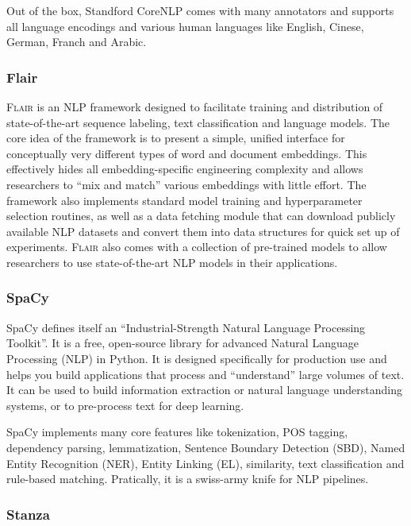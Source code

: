 Out of the box, Standford CoreNLP comes with many annotators and
supports all language encodings and various human languages like
English, Cinese, German, Franch and Arabic.

\subsubsection{Flair}

\textsc{Flair} \cite{akbik2019flair} is an NLP framework designed to
facilitate training and distribution of state-of-the-art sequence
labeling, text classification and language models. The core idea of
the framework is to present a simple, unified interface for
conceptually very different types of word and document embeddings.
This effectively hides all embedding-specific engineering complexity
and allows researchers to ``mix and match'' various embeddings with
little effort. The framework also implements standard model training
and hyperparameter selection routines, as well as a data fetching
module that can download publicly available NLP datasets and convert
them into data structures for quick set up of experiments.
\textsc{Flair} also comes with a collection of pre-trained models to
allow researchers to use state-of-the-art NLP models in their
applications.

\subsubsection{SpaCy}

SpaCy defines itself an ``Industrial-Strength Natural Language
Processing Toolkit''. It is a free, open-source library for advanced
Natural Language Processing (NLP) in Python. It is designed
specifically for production use and helps you build applications that
process and ``understand'' large volumes of text. It can be used to
build information extraction or natural language understanding
systems, or to pre-process text for deep learning.

SpaCy implements many core features like tokenization, POS tagging,
dependency parsing, lemmatization, Sentence Boundary Detection (SBD),
Named Entity Recognition (NER), Entity Linking (EL), similarity, text
classification and rule-based matching. Pratically, it is a swiss-army
knife for NLP pipelines.

\subsubsection{Stanza}

